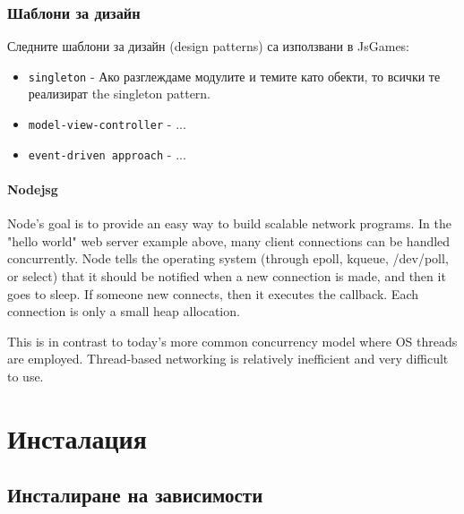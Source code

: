 \documentclass[a4paper]{article}
\def\jsg{JsGames}
\begin{document}
\subsubsection{Шаблони за дизайн}
Следните шаблони за дизайн (design patterns) са използвани в \jsg: 

\begin{itemize}
  \item \texttt{singleton} - Ако разглеждаме модулите и темите като обекти, то всички те реализират the singleton pattern. 
  \item \texttt{model-view-controller} - ...
  \item \texttt{event-driven approach} - ...
\end{itemize}


\paragraph{Nodejsg}
Node's goal is to provide an easy way to build scalable network programs. In the "hello world" web server example above, many client connections can be handled concurrently. Node tells the operating system (through epoll, kqueue, /dev/poll, or select) that it should be notified when a new connection is made, and then it goes to sleep. If someone new connects, then it executes the callback. Each connection is only a small heap allocation.

This is in contrast to today's more common concurrency model where OS threads are employed. Thread-based networking is relatively inefficient and very difficult to use.

\section{Инсталация}

\subsection{Инсталиране на зависимости}
\end{document}
